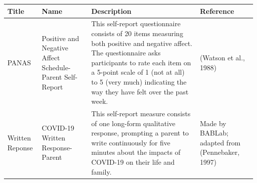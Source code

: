 \documentclass[]{book}
\begin{document}
\begin{longtable}[]{@{}llll@{}}
\toprule
\begin{minipage}[b]{0.13\columnwidth}\raggedright
Title\strut
\end{minipage} & \begin{minipage}[b]{0.21\columnwidth}\raggedright
Name\strut
\end{minipage} & \begin{minipage}[b]{0.38\columnwidth}\raggedright
Description\strut
\end{minipage} & \begin{minipage}[b]{0.15\columnwidth}\raggedright
Reference\strut
\end{minipage}\tabularnewline
\midrule
\endhead
\begin{minipage}[t]{0.13\columnwidth}\raggedright
PANAS\strut
\end{minipage} & \begin{minipage}[t]{0.21\columnwidth}\raggedright
Positive and Negative Affect Schedule- Parent Self-Report\strut
\end{minipage} & \begin{minipage}[t]{0.38\columnwidth}\raggedright
This self-report questionnaire consists of 20 items measuring both positive and negative affect. The questionnaire asks participants to rate each item on a 5-point scale of 1 (not at all) to 5 (very much) indicating the way they have felt over the past week.\strut
\end{minipage} & \begin{minipage}[t]{0.15\columnwidth}\raggedright
(Watson et al., 1988)\strut
\end{minipage}\tabularnewline
\begin{minipage}[t]{0.13\columnwidth}\raggedright
Written Reponse\strut
\end{minipage} & \begin{minipage}[t]{0.21\columnwidth}\raggedright
COVID-19 Written Response- Parent\strut
\end{minipage} & \begin{minipage}[t]{0.38\columnwidth}\raggedright
This self-report measure consists of one long-form qualitative response, prompting a parent to write continuously for five minutes about the impacts of COVID-19 on their life and family.\strut
\end{minipage} & \begin{minipage}[t]{0.15\columnwidth}\raggedright
Made by BABLab; adapted from (Pennebaker, 1997)\strut
\end{minipage}\tabularnewline
\bottomrule
\end{longtable}
\end{document}
